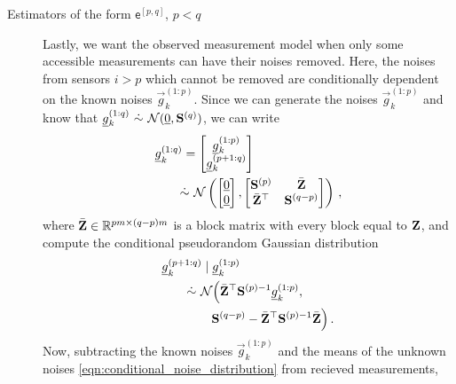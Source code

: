 \begin{description}
  \item[Estimators of the form $\mathsf{e}^{[p,q]}$, $p<q$] Lastly, we want the observed measurement model when only some accessible measurements can have their noises removed. Here, the noises from sensors $i>p$ which cannot be removed are conditionally dependent on the known noises $\vec{g}_k^{(1:p)}$. Since we can generate the noises $\vec{g}_k^{(1:p)}$ and know that $\vec{g}_k^{(1:q)}\ \dot{\sim}\ \mathcal{N}(\vec{0}, \mat{S}^{(q)})$, we can write 
  \begin{equation}\label{eqn:block_noises_and_correlation}
    \begin{split}
      &{\underline{g}}_k^{(1:q)}=
      \begin{bmatrix}
        {\underline{g}}_k^{(1:p)}\\
        {\underline{g}}_k^{(p+1:q)}\\
      \end{bmatrix}\\ 
      &\qquad \dot{\sim}\ \mathcal{N}\left(
      \begin{bmatrix}
        {\underline{0}}\\
        {\underline{0}}
      \end{bmatrix},
      \begin{bmatrix}
        {\ensuremath{{\mathbf{S}}}}^{(p)} & \bar{{{\mathbf{Z}}}}\\
        \bar{{{\mathbf{Z}}}}^\top & {{\mathbf{S}}}^{(q-p)}
      \end{bmatrix}\right)\,,
    \end{split}
  \end{equation}
  where $\bar{{{\mathbf{Z}}}} \in \mathbb{R}^{pm \times (q-p)m}$ is a block matrix with every block equal to ${{\mathbf{Z}}}$, and compute the conditional pseudorandom Gaussian distribution
  \begin{equation}\label{eqn:conditional_noise_distribution}
    \begin{split}
      &\vec{g}_k^{(p+1:q)} \mid \vec{g}_k^{(1:p)}\\
      &\qquad \dot{\sim}\ \mathcal{N}\Big(\bar{\mat{Z}}^\top\mat{S}^{(p)-1}\vec{g}_k^{(1:p)},\\
      &\qquad\qquad \mat{S}^{(q-p)} - \bar{\mat{Z}}^\top\mat{S}^{(p)-1}\bar{\mat{Z}}\Big)\,.
    \end{split}
  \end{equation}
  Now, subtracting the known noises $\vec{g}_k^{(1:p)}$ and the means of the unknown noises \eqref{eqn:conditional_noise_distribution} from recieved measurements,
  \begin{equation}\label{eqn:pq_measurement_offset}

\end{equation}
\end{description}
